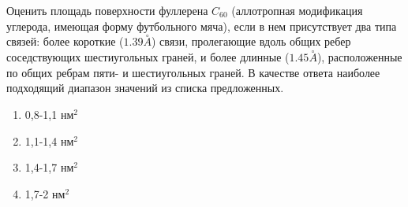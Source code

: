 
Оценить
площадь поверхности фуллерена $C_{60}$ (аллотропная модификация углерода, имеющая
форму футбольного мяча), если в нем присутствует два типа связей: более
короткие ($1.39 \stackrel{\circ}{A}$) связи, пролегающие вдоль общих ребер соседствующих
шестиугольных граней, и более длинные ($1.45 \stackrel{\circ}{A}$), расположенные по общих ребрам
пяти- и шестиугольных граней. В качестве ответа наиболее подходящий диапазон значений из списка
предложенных.

\begin{enumerate}
    \item 0,8-1,1 нм$^2$
    \item 1,1-1,4 нм$^2$
    \item 1,4-1,7 нм$^2$
    \item 1,7-2 нм$^2$
\end{enumerate}



